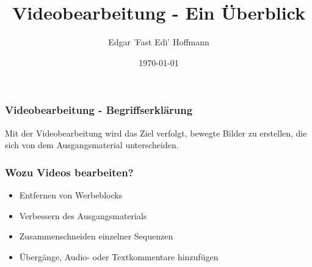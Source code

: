 \documentclass{beamer}
\title[FreieSoftwareOG.org - Videobearbeitung - Ein Überblick]{Videobearbeitung - Ein Überblick} %
\author{Edgar 'Fast Edi' Hoffmann}		%
\institute[FSOG]					%
{
Community FreieSoftwareOG \\			%
\medskip
\textit{kontakt@freiesoftwareog.org}		%
}
\date{\today}					%
\begin{document}
\begin{frame}[plain]			%
	\titlepage				%
\end{frame}



\begin{frame}
\frametitle{Videobearbeitung - Begriffserklärung}

\pause
Mit der Videobearbeitung wird das Ziel verfolgt, bewegte Bilder zu erstellen, die sich von dem Ausgangsmaterial unterscheiden.

\end{frame}

\begin{frame}

\frametitle{Wozu Videos bearbeiten?}

\pause

	\begin{itemize}
		\item Entfernen von Werbeblocks
		\item Verbessern des Ausgangsmaterials
		\item Zusammenschneiden einzelner Sequenzen
		\item Übergänge, Audio- oder Textkommentare hinzufügen
	\end{itemize}

\end{frame}
\end{document}
